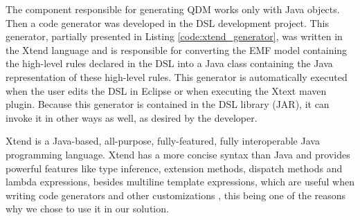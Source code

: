 \documentclass[twocolumn]{bmcart}%
\begin{document}
The component responsible for generating QDM works only with Java objects. Then a code generator was developed in the DSL development project. This generator, partially presented in Listing \ref{code:xtend_generator}, was written in the Xtend language and is responsible for converting the EMF model containing the high-level rules declared in the DSL into a Java class containing the Java representation of these high-level rules. This generator is automatically executed when the user edits the DSL in Eclipse or when executing the Xtext maven plugin. Because this generator is contained in the DSL library (JAR), it can invoke it in other ways as well, as desired by the developer.



Xtend is a Java-based, all-purpose, fully-featured, fully interoperable Java programming language. Xtend has a more concise syntax than Java and provides powerful features like type inference, extension methods, dispatch methods and lambda expressions, besides multiline template expressions, which are useful when writing code generators and other customizations \cite{bettini2016}, this being one of the reasons why we chose to use it in our solution.
\end{document}
